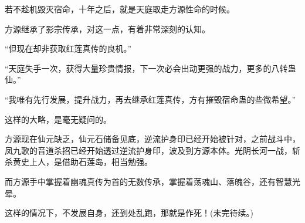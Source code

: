\begin{this_body}
若不趁机毁灭宿命，十年之后，就是天庭取走方源性命的时候。

方源继承了影宗传承，对这一点，有着非常深刻的认知。

“但现在却非获取红莲真传的良机。”

“天庭失手一次，获得大量珍贵情报，下一次必会出动更强的战力，更多的八转蛊仙。”

“我唯有先行发展，提升战力，再去继承红莲真传，方有摧毁宿命蛊的些微希望。”

这样的大略，是毫无疑问的。

方源现在仙元缺乏，仙元石储备见底，逆流护身印已经开始被针对，之前战斗中，凤九歌的音道杀招已经开始透过逆流护身印，波及到方源本体。光阴长河一战，斩杀黄史上人，是借助石莲岛，相当勉强。

而方源手中掌握着幽魂真传为首的无数传承，掌握着荡魂山、落魄谷，还有智慧光晕。

这样的情况下，不发展自身，还到处乱跑，那就是作死！(未完待续。)

\end{this_body}

